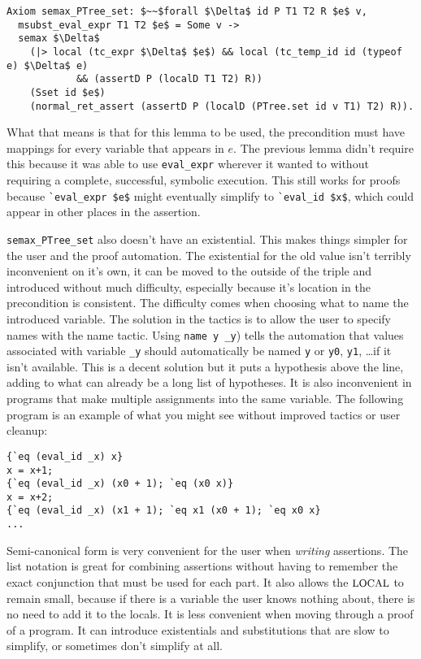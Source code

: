 \documentclass{puthesis}
\begin{document}
\begin{lstlisting}
Axiom semax_PTree_set: $~~$forall $\Delta$ id P T1 T2 R $e$ v,
  msubst_eval_expr T1 T2 $e$ = Some v ->
  semax $\Delta$
    (|> local (tc_expr $\Delta$ $e$) && local (tc_temp_id id (typeof e) $\Delta$ e) 
            && (assertD P (localD T1 T2) R))
    (Sset id $e$)
    (normal_ret_assert (assertD P (localD (PTree.set id v T1) T2) R)).
\end{lstlisting}

What that means is that for this lemma to be used, the precondition must
have mappings for every variable that appears in $e$. The previous 
lemma didn't require this because it was able to use \lstinline|eval_expr|
wherever it wanted to without requiring a complete, successful, symbolic
execution. This still works for proofs because \lstinline|`eval_expr $e$|
might eventually simplify to \lstinline|`eval_id $x$|, which could appear
in other places in the assertion. 

\lstinline|semax_PTree_set| also doesn't have an existential. This
makes things simpler for the user and the proof automation. The existential
for the old value isn't terribly inconvenient on it's own, it can be 
moved to the outside of the triple and introduced without much difficulty,
especially because it's location in the precondition is consistent. The
difficulty comes when choosing what to name the introduced variable. The
solution in the tactics is to allow the user to specify names with the name
tactic. Using \lstinline|name y _y|) tells the automation that values
associated with variable \lstinline|_y| should automatically be named
\lstinline|y| or \lstinline|y0|, \lstinline|y1|, \ldots if it isn't available.
This is a decent solution but it puts a hypothesis above the line, adding
to what can already be a long list of hypotheses. It is also inconvenient
in programs that make multiple assignments into the same variable. The
following program is an example of what you might see without improved
tactics or user cleanup: 

\begin{lstlisting}
{`eq (eval_id _x) x}
x = x+1;
{`eq (eval_id _x) (x0 + 1); `eq (x0 x)}
x = x+2;
{`eq (eval_id _x) (x1 + 1); `eq x1 (x0 + 1); `eq x0 x}
...
\end{lstlisting}



Semi-canonical form is very convenient for the user when \emph{writing}
assertions. The list notation is great for combining 
assertions without having to remember the exact conjunction that
must be used for each part. It also allows the $\mbox{\small LOCAL}$ to remain
small, because if there is a variable the user knows nothing
about, there is no need to add it to the locals. It is less convenient
when moving through a proof of a program. It can introduce
existentials and substitutions that are slow to simplify, or sometimes
don't simplify at all. 
\end{document}
